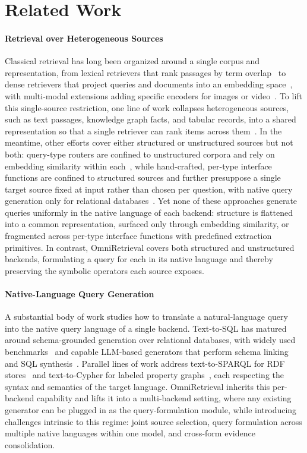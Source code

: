 \documentclass{llmxive}
\begin{document}
\section{Related Work}

\paragraph{Retrieval over Heterogeneous Sources}
Classical retrieval has long been organized around a single corpus and representation, from lexical retrievers that rank passages by term overlap~\citep{BM25, tfidf} to dense retrievers that project queries and documents into an embedding space~\citep{DPR, ANCE}, with multi-modal extensions adding specific encoders for images or video~\citep{CLIP, VideoRAG}. To lift this single-source restriction, one line of work collapses heterogeneous sources, such as text passages, knowledge graph facts, and tabular records, into a shared representation so that a single retriever can rank items across them~\citep{UniK, UDT, DiFaR}. In the meantime, other efforts cover either structured or unstructured sources but not both: query-type routers are confined to unstructured corpora and rely on embedding similarity within each~\citep{UniversalRAG}, while hand-crafted, per-type interface functions are confined to structured sources and further presuppose a single target source fixed at input rather than chosen per question, with native query generation only for relational databases~\citep{StructGPT}. Yet none of these approaches generate queries uniformly in the native language of each backend: structure is flattened into a common representation, surfaced only through embedding similarity, or fragmented across per-type interface functions with predefined extraction primitives. In contrast, OmniRetrieval covers both structured and unstructured backends, formulating a query for each in its native language and thereby preserving the symbolic operators each source exposes.

\paragraph{Native-Language Query Generation}
A substantial body of work studies how to translate a natural-language query into the native query language of a single backend. Text-to-SQL has matured around schema-grounded generation over relational databases, with widely used benchmarks~\citep{Spider, Bird} and capable LLM-based generators that perform schema linking and SQL synthesis~\citep{Text2SQL-LLM1, Text2SQL-LLM2}. Parallel lines of work address text-to-SPARQL for RDF stores~\citep{SP-LLM1, SP-LLM2, Text2SPARQL} and text-to-Cypher for labeled property graphs~\citep{GPT4Graph, Text2Cypher}, each respecting the syntax and semantics of the target language. OmniRetrieval inherits this per-backend capability and lifts it into a multi-backend setting, where any existing generator can be plugged in as the query-formulation module, while introducing challenges intrinsic to this regime: joint source selection, query formulation across multiple native languages within one model, and cross-form evidence consolidation.
\end{document}
